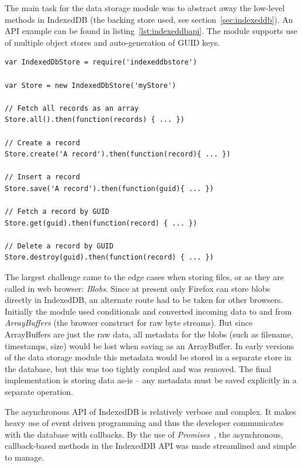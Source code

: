 The main task for the data storage module was to abstract away the low-level methods in IndexedDB (the backing store used, see section~\ref{sec:indexeddb}). An API example can be found in listing~\ref{lst:indexeddbapi}. The module supports use of multiple object stores and auto-generation of GUID keys.

\begin{Code}
\begin{lstlisting}[caption={Common database operations}, label={lst:indexeddbapi}]
var IndexedDbStore = require('indexeddbstore')

var Store = new IndexedDbStore('myStore')

// Fetch all records as an array
Store.all().then(function(records) { ... })

// Create a record
Store.create('A record').then(function(record){ ... })

// Insert a record
Store.save('A record').then(function(guid){ ... })

// Fetch a record by GUID
Store.get(guid).then(function(record) { ... })

// Delete a record by GUID
Store.destroy(guid).then(function(record) { ... })
\end{lstlisting}
\end{Code}

The largest challenge came to the edge cases when storing files, or as they are called in web browser: \emph{Blobs}. Since at present only Firefox can store blobs directly in IndexedDB, an alternate route had to be taken for other browsers. Initially the module used conditionals and converted incoming data to and from \emph{ArrayBuffers} (the browser construct for raw byte streams). But since ArrayBuffers are just the raw data, all metadata for the blobs (such as filename, timestamps, size) would be lost when saving as an ArrayBuffer. In early versions of the data storage module this metadata would be stored in a separate store in the database, but this was too tightly coupled and was removed. The final implementation is storing data as-is – any metadata must be saved explicitly in a separate operation.

The asynchronous API of IndexedDB is relatively verbose and complex. It makes heavy use of event driven programming and thus the developer communicates with the database with callbacks. By the use of \emph{Promises}~\cite{Promises:Online}, the asynchronous, callback-based methods in the IndexedDB API was made streamlined and simple to manage.

